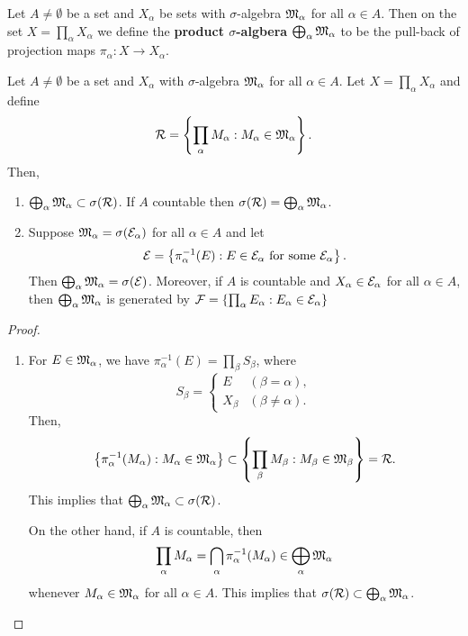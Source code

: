\documentclass[a4paper]{article}
\begin{document}
\begin{defi}
  Let $A \neq \emptyset$ be a set and $X_\alpha$ be sets 
  with $\sigma$-algebra $\mathfrak{M}_\alpha$ for all 
    $\alpha \in A$. Then on the set $X = \prod_\alpha X_\alpha$
    we define the \textbf{product $\sigma$-algbera} 
    $\bigoplus_\alpha \mathfrak{M}_\alpha$ to be the 
    pull-back of projection maps 
    $\pi_\alpha : X \to X_\alpha$.
\end{defi}
{
\begin{thm}
  Let $A \neq \emptyset$ be a set and $X_\alpha$ 
  with $\sigma$-algebra $\mathfrak{M}_\alpha$ for all $\alpha 
  \in A$. Let $X = \prod_\alpha X_\alpha$ and 
  define 
  \[
  \mathcal{R} = \left\{ \prod_\alpha M_\alpha: 
  M_\alpha \in \mathfrak{M}_\alpha \right\}.
  \]
  Then, 
  \begin{enumerate}
    \item $\bigoplus_\alpha \mathfrak{M}_\alpha \subset \sigma 
    (\mathcal{R})$. If $A$ countable then $\sigma(\mathcal{R}) 
    = \bigoplus_\alpha \mathfrak{M}_\alpha$.
    
    \item Suppose $\mathfrak{M}_\alpha = \sigma(\mathcal{E}_\alpha)$
    for all $\alpha \in A$ and let 
    \[
    \mathcal{E} = \left\{ \pi_\alpha^{-1}(E) : 
    E \in \mathcal{E}_\alpha \text{ for some $\mathcal{E}_\alpha$} \right\}.
    \]
    Then $\bigoplus_\alpha \mathfrak{M}_\alpha = \sigma(\mathcal{E})$. 
    Moreover, if $A$ is countable and $X_\alpha \in \mathcal{E}_\alpha$
    for all $\alpha \in A$, then $\bigoplus_\alpha \mathfrak{M}_\alpha$
    is generated by $\mathcal{F} = \left\{ \prod_\alpha E_\alpha :
    E_\alpha \in \mathcal{E}_\alpha \right\}$
  \end{enumerate}
\end{thm}

\begin{proof}
\begin{enumerate}
\item For $E \in \mathfrak{M}_\alpha$, we have 
$\pi^{-1}_\alpha (E) = \prod_\beta S_\beta$, where 
\[
S_\beta = \begin{cases}
  E & (\beta = \alpha), \\ 
  X_\beta & (\beta \neq \alpha).
\end{cases}
\]
Then, 
\[
\left\{ \pi_\alpha^{-1}(M_\alpha) : M_\alpha 
\in \mathfrak{M}_\alpha \right\}
\subset \left\{ \prod_\beta M_\beta: M_\beta \in 
\mathfrak{M}_\beta \right\} = \mathcal{R}.
\]
This implies that $\bigoplus_\alpha \mathfrak{M}_\alpha \subset 
\sigma(\mathcal{R})$.

On the other hand, if $A$ is countable, then 
\[
\prod_\alpha M_\alpha = 
\bigcap_\alpha \pi_\alpha^{-1} (M_\alpha) 
\in \bigoplus_\alpha \mathfrak{M}_\alpha
\]
whenever $M_\alpha \in \mathfrak{M}_\alpha$ for all $\alpha \in A$.
This implies that $\sigma(\mathcal{R}) \subset \bigoplus_\alpha 
\mathfrak{M}_\alpha$.


\end{enumerate}
\end{proof}}
\end{document}
